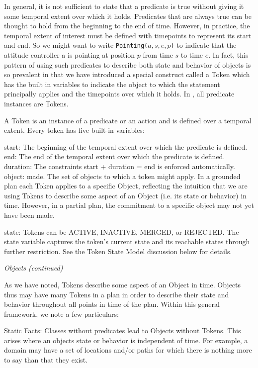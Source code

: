 In general, it is not sufficient to state that a predicate is true
without giving it some temporal extent over which it holds. Predicates
that are always true can be thought to hold from the beginning to the
end of time. However, in practice, the temporal extent of interest
must be defined with timepoints to represent its start and end. So we
might want to write \texttt{Pointing($a,s,e,p$)} to indicate that the
attitude controller a is pointing at position $p$ from time $s$ to
time $e$. In fact, this pattern of using such predicates to describe
both state and behavior of objects is so prevalent in \eu that we have
introduced a special construct called a Token which has the built in
variables to indicate the object to which the statement principally
applies and the timepoints over which it holds. In \eu, all predicate
instances are Tokens.


A Token is an instance of a predicate or an action and is defined over
a temporal extent. Every token has five built-in variables:

start: The beginning of the temporal extent over which the predicate
is defined.  end: The end of the temporal extent over which the
predicate is defined.  duration: The constraints start + duration =
end is enforced automatically.  object: made. The set of objects to
which a token might apply. In a grounded plan each Token applies to a
specific Object, reflecting the intuition that we are using Tokens to
describe some aspect of an Object (i.e. its state or behavior) in
time. However, in a partial plan, the commitment to a specific object
may not yet have been made.

state: Tokens can be ACTIVE, INACTIVE, MERGED, or REJECTED. The state
variable captures the token's current state and its reachable states
through further restriction. See the Token State Model discussion
below for details.

\textit{Objects (continued)}

As we have noted, Tokens describe some aspect of an Object in
time. Objects thus may have many Tokens in a plan in order to describe
their state and behavior throughout all points in time of the
plan. Within this general framework, we note a few particulars:

Static Facts: Classes without predicates lead to Objects without
Tokens. This arises where an objects state or behavior is independent
of time. For example, a domain may have a set of locations and/or
paths for which there is nothing more to say than that they exist.

